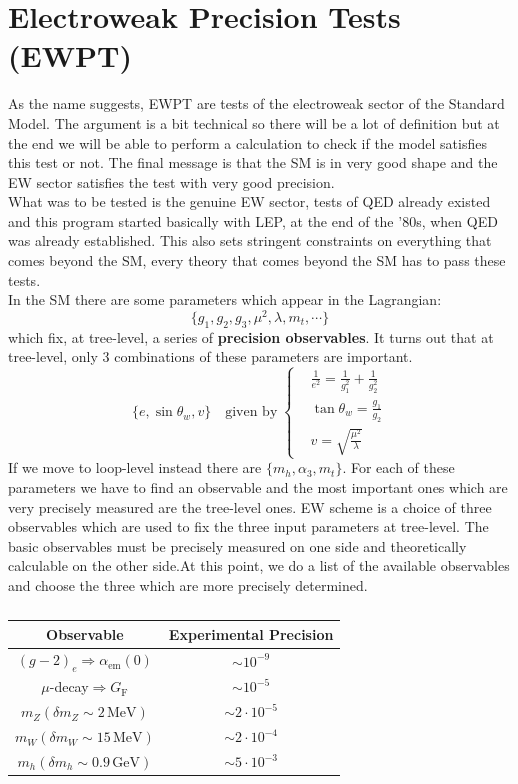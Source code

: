 \documentclass[../main.tex]{subfiles}
\begin{document}
\section{Electroweak Precision Tests (EWPT)}
As the name suggests, EWPT are tests of the electroweak sector of the Standard Model. The argument is a bit technical so there will be a lot of definition but at the end we will be able to perform a calculation to check if the model satisfies this test or not. The final message is that the SM is in very good shape and the EW sector satisfies the test with very good precision.\\
What was to be tested is the genuine EW sector, tests of QED already existed and this program started basically with LEP, at the end of the '80s, when QED was already established. This also sets stringent constraints on everything that comes beyond the SM, every theory that comes beyond the SM has to pass these tests.\\
In the SM there are some parameters which appear in the Lagrangian:
\[
\{g_1, g_2, g_3, \mu^2, \lambda, m_t,\cdots\}
\]
which fix, at tree-level, a series of \textbf{precision observables}. It turns out that at tree-level, only 3 combinations of these parameters are important.
\[
\{e,\sin\theta_w,v\} \quad \text{given by}\; \left\{
\begin{aligned}
&\frac{1}{e^2}=\frac{1}{g_1^2}+\frac{1}{g_2^2}\\
&\tan\theta_w=\frac{g_1}{g_2}\\
&v=\sqrt{\frac{\mu^2}{\lambda}}
\end{aligned}
\right.
\]
If we move to loop-level instead there are $\{m_h, \alpha_3, m_t\}$. For each of these parameters we have to find an observable and the most important ones which are very precisely measured are the tree-level ones. EW scheme is a choice of three observables which are used to fix the three input parameters at tree-level. The basic observables must be precisely measured on one side and theoretically calculable on the other side.At this point, we do a list of the available observables and choose the three which are more precisely determined.
\begin{table}[h]
    \centering
    \begin{tabular}{c|c}
    \hline
    \rowcolor{blue!45} Observable & Experimental Precision\\
    \hline
    $(g-2)_e\Rightarrow\alpha_{\text{em}}(0)$ & $\sim10^{-9}$\\
    $\mu$-decay$\Rightarrow G_{\text{F}}$ & $\sim10^{-5}$\\
    $m_Z(\delta m_Z\sim2\,\text{MeV})$ & $\sim2\cdot10^{-5}$\\
    $m_W(\delta m_W\sim15\,\text{MeV})$ & $\sim2\cdot10^{-4}$\\
    $m_h(\delta m_h\sim0.9\,\text{GeV})$ & $\sim5\cdot10^{-3}$\\
    \hline
    \end{tabular}
    \caption*{}
\end{table}\\
\end{document}
